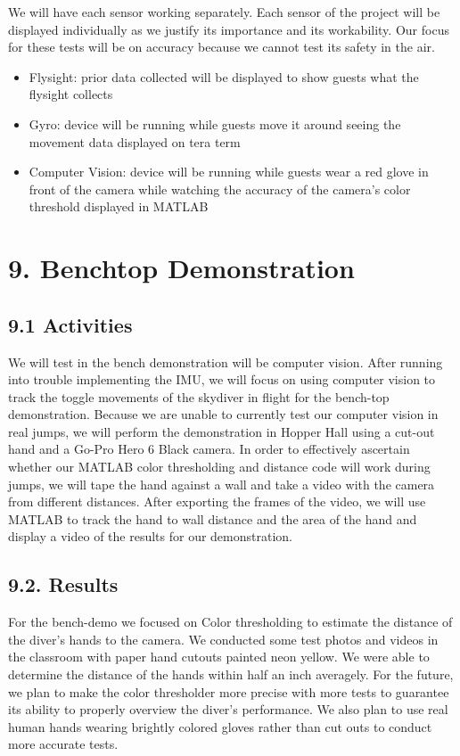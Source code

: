 \documentclass[10pt]{article}
\begin{document}
We will have each sensor working separately. Each sensor of the project will be displayed individually as we justify its importance and its workability. Our focus for these tests will be on accuracy because we cannot test its safety in the air.
\begin{itemize}
\item Flysight: prior data collected will be displayed to show guests what the flysight collects
\item Gyro: device will be running while guests move it around seeing the movement data displayed on tera term
\item Computer Vision: device will be running while guests wear a red glove in front of the camera while watching the accuracy of the camera’s color threshold displayed in MATLAB
\end{itemize}



\section{9. Benchtop Demonstration}
\subsection{9.1 Activities}
We will test in the bench demonstration will be computer vision. After running into trouble implementing the IMU, we will focus on using computer vision to track the toggle movements of the skydiver in flight for the bench-top demonstration. Because we are unable to currently test our computer vision in real jumps, we will perform the demonstration in Hopper Hall using a cut-out hand and a Go-Pro Hero 6 Black camera. In order to effectively ascertain whether our MATLAB color thresholding and distance code will work during jumps, we will tape the hand against a wall and take a video with the camera from different distances. After exporting the frames of the video, we will use MATLAB to track the hand to wall distance and the area of the hand and display a video of the results for our demonstration.

\subsection{9.2. Results}
For the bench-demo we focused on Color thresholding to estimate the distance of the diver’s hands to the camera. We conducted some test photos and videos in the classroom with paper hand cutouts painted neon yellow. We were able to determine the distance of the hands within half an inch averagely. For the future, we plan to make the color thresholder more precise with more tests to guarantee its ability to properly overview the diver’s performance. We also plan to use real human hands wearing brightly colored gloves rather than cut outs to conduct more accurate tests.
\end{document}
